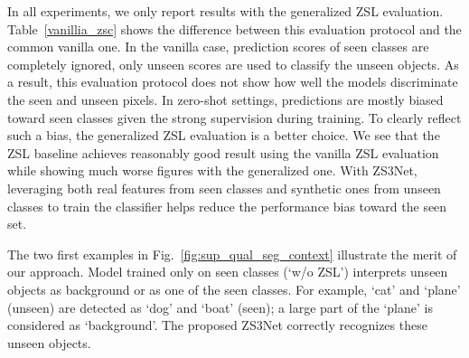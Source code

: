 \documentclass{article}
\begin{document}
In all experiments, we only report results with the generalized ZSL evaluation. Table~\ref{vanillia_zsc} shows the difference between this evaluation protocol and the common vanilla one.
In the vanilla case, prediction scores of seen classes are completely ignored, only unseen scores are used to classify the unseen objects.
As a result, this evaluation protocol does not show how well the models discriminate the seen and unseen pixels.
In zero-shot settings, predictions are mostly biased toward seen classes given the strong supervision during training.
To clearly reflect such a bias, the generalized ZSL evaluation is a better choice.
We see that the ZSL baseline achieves reasonably good result using the vanilla ZSL evaluation while showing much worse figures with the generalized one.
With ZS3Net, leveraging both real features from seen classes and synthetic ones from unseen classes to train the classifier helps reduce the performance bias toward the seen set.

The two first examples in Fig.~\ref{fig:sup_qual_seg_context} illustrate the merit of our approach. Model trained only on seen classes (`w/o ZSL')  interprets unseen objects as background or as one of the seen classes.
For example, `cat' and `plane' (unseen) are detected as `dog' and `boat' (seen); a large part of the `plane' is considered as `background'.
The proposed ZS3Net correctly recognizes these unseen objects.
\end{document}
